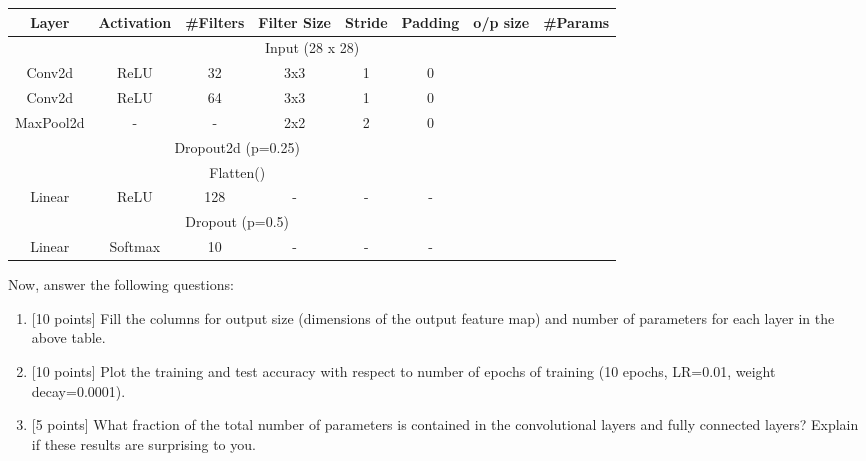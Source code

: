 \documentclass[letterpaper]{article}
\begin{document}
\begin{enumerate}
\begin{tabular}{|c|c|c|c|c|c|c|c|}
\hline
\textbf{Layer} & \textbf{Activation} & \textbf{\#Filters} & \textbf{Filter Size} & \textbf{Stride} & \textbf{Padding} & \textbf{o/p size} & \textbf{\#Params} \\ \hline
\multicolumn{8}{|c|}{Input (28 x 28)}                                                                                                                               \\ \hline
Conv2d         & ReLU                & 32                 & 3x3                  & 1               & 0                &                         &                   \\ \hline
Conv2d         & ReLU                & 64                 & 3x3                  & 1               & 0                &                         &                   \\ \hline
MaxPool2d      & -                   & -                  & 2x2                  & 2               & 0                &                         &                   \\ \hline
\multicolumn{6}{|c|}{Dropout2d (p=0.25)}                                                                              &                         &                   \\ \hline
\multicolumn{6}{|c|}{Flatten()}                                                                                       &                         &                   \\ \hline
Linear         & ReLU                & 128                & -                    & -               & -                &                         &                   \\ \hline
\multicolumn{6}{|c|}{Dropout (p=0.5)}                                                                                 &                         &                   \\ \hline
Linear         & Softmax             & 10                 & -                    & -               & -                &                         &                   \\ \hline
\end{tabular}

Now, answer the following questions:
\begin{enumerate}
    \item {[10 points]} Fill the columns for output size (dimensions of the output feature map) and number of parameters for each layer in the above table.
    
    \item {[10 points]} Plot the training and test accuracy with respect to number of epochs of training (10 epochs, LR=0.01, weight decay=0.0001).
    
    \item {[5 points]} What fraction of the total number of parameters is contained in the convolutional layers and fully connected layers? Explain if these results are surprising to you. 
    

\end{enumerate}

\end{enumerate}
\end{document}
